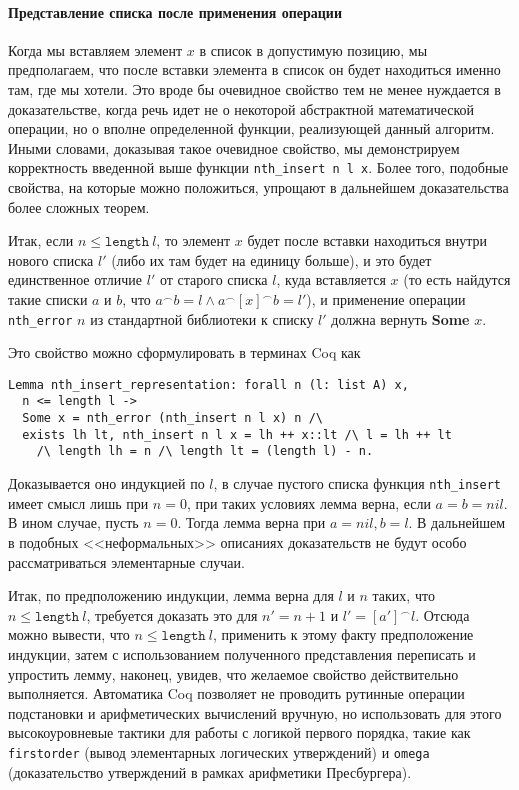 \paragraph{Представление списка после применения операции} Когда мы вставляем элемент $x$ в список в допустимую позицию, мы предполагаем, что после вставки элемента в список он будет находиться именно там, где мы хотели. Это вроде бы очевидное свойство тем не менее нуждается в доказательстве, когда речь идет не о некоторой абстрактной математической операции, но о вполне определенной функции, реализующей данный алгоритм. Иными словами, доказывая такое очевидное свойство, мы демонстрируем корректность введенной выше функции \texttt{nth\_insert n l x}. Более того, подобные свойства, на которые можно положиться, упрощают в дальнейшем доказательства более сложных теорем.

Итак, если $n \leq \texttt{length}\ l$, то элемент $x$ будет после вставки находиться внутри нового списка $l'$ (либо их там будет на единицу больше), и это будет единственное отличие $l'$ от старого списка $l$, куда вставляется $x$ (то есть найдутся такие списки $a$ и $b$, что $a^\frown  b = l \wedge a^\frown [x]^\frown b = l'$),  и применение операции \texttt{nth\_error} $n$ из стандартной библиотеки к списку $l'$ должна вернуть \textbf{Some} $x$.

Это свойство можно сформулировать в терминах Coq как
\begin{Verbatim}[fontsize=\small]
Lemma nth_insert_representation: forall n (l: list A) x,
  n <= length l ->
  Some x = nth_error (nth_insert n l x) n /\
  exists lh lt, nth_insert n l x = lh ++ x::lt /\ l = lh ++ lt
    /\ length lh = n /\ length lt = (length l) - n.
 \end{Verbatim}

Доказывается оно индукцией по $l$, в случае пустого списка функция \texttt{nth\_insert} имеет смысл лишь при $n = 0$, при таких условиях лемма верна, если $a = b = nil$. В ином случае, пусть $n = 0$. Тогда лемма верна при $a = nil, b = l$. В дальнейшем в подобных <<неформальных>> описаниях доказательств не будут особо рассматриваться элементарные случаи.

Итак, по предположению индукции, лемма верна для $l$ и $n$ таких, что $n \leq \texttt{length}\ l$, требуется доказать это для $n' = n + 1$ и $l' = [a']^\frown l$. Отсюда можно вывести, что $n \leq \texttt{length}\ l$, применить к этому факту предположение индукции, затем с использованием полученного представления переписать и упростить лемму, наконец, увидев, что желаемое свойство действительно выполняется. Автоматика Coq позволяет не проводить рутинные операции подстановки и арифметических вычислений вручную, но использовать для этого высокоуровневые тактики для работы с логикой первого порядка, такие как \texttt{firstorder} (вывод элементарных логических утверждений) и \texttt{omega} (доказательство утверждений в рамках арифметики Пресбургера).

